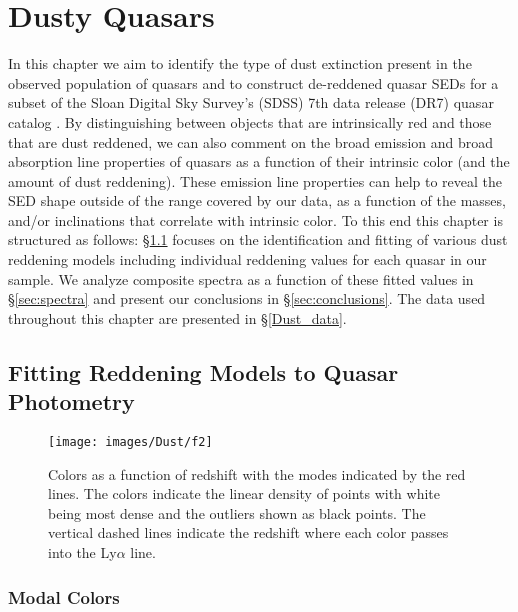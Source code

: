 \chapter{Dusty Quasars} \label{Dust}

In this chapter we aim to identify the type of dust extinction present in the observed population of quasars and to construct de-reddened quasar SEDs for a subset of the Sloan Digital Sky Survey's (SDSS) 7th data release (DR7) quasar catalog \citep{Schneider:2010}.  By distinguishing between objects that are intrinsically red and those that are dust reddened, we can also comment on the broad emission \citep[e.g., ][]{Richards:2003} and broad absorption line \citep[e.g., ][]{Reichard:2003a,Reichard:2003b} properties of quasars as a function of their intrinsic color (and the amount of dust reddening).  These emission line properties can help to reveal the SED shape outside of the range covered by our data, as a function of the masses, and/or inclinations that correlate with intrinsic color.
To this end this chapter is structured as follows:  \S\ref{sec:model} focuses on the identification and fitting of various dust reddening models including individual reddening values for each quasar in our sample. We analyze composite spectra as a function of these fitted values in \S\ref{sec:spectra} and present our conclusions in \S\ref{sec:conclusions}. The data used throughout this chapter are presented in \S\ref{Dust_data}.

\section{Fitting Reddening Models to Quasar Photometry} \label{sec:model}

\begin{figure*}%
\begin{center}
\texttt{[image: images/Dust/f2]}
\caption[Colors vs. redshift]{\label{fig:mode} Colors as a function of redshift with the modes indicated by the red lines.  The colors indicate the linear density of points with white being most dense and the outliers shown as black points. The vertical dashed lines indicate the redshift where each color passes into the Ly$\alpha$ line.}
\end{center}
\end{figure*}

\subsection{Modal Colors}

